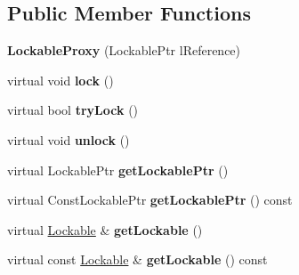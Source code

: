 \subsection*{Public Member Functions}
\begin{DoxyCompactItemize}
\item 
\hypertarget{classcore_1_1threading_1_1_lockable_proxy_a1b094fd270476942586424d0e05926b9}{{\bfseries Lockable\-Proxy} (Lockable\-Ptr l\-Reference)}\label{classcore_1_1threading_1_1_lockable_proxy_a1b094fd270476942586424d0e05926b9}

\item 
\hypertarget{classcore_1_1threading_1_1_lockable_proxy_a5e2568379e7f307d3dd5487d4eecf0ad}{virtual void {\bfseries lock} ()}\label{classcore_1_1threading_1_1_lockable_proxy_a5e2568379e7f307d3dd5487d4eecf0ad}

\item 
\hypertarget{classcore_1_1threading_1_1_lockable_proxy_a61b2ff8037fa96e8636eb7594214097b}{virtual bool {\bfseries try\-Lock} ()}\label{classcore_1_1threading_1_1_lockable_proxy_a61b2ff8037fa96e8636eb7594214097b}

\item 
\hypertarget{classcore_1_1threading_1_1_lockable_proxy_acb267ce5725011cd729eaf300ea0a82c}{virtual void {\bfseries unlock} ()}\label{classcore_1_1threading_1_1_lockable_proxy_acb267ce5725011cd729eaf300ea0a82c}

\item 
\hypertarget{classcore_1_1threading_1_1_lockable_proxy_a6c2725f84357c795694c026f30a593a0}{virtual Lockable\-Ptr {\bfseries get\-Lockable\-Ptr} ()}\label{classcore_1_1threading_1_1_lockable_proxy_a6c2725f84357c795694c026f30a593a0}

\item 
\hypertarget{classcore_1_1threading_1_1_lockable_proxy_a9e759252b36c8ac5e9ad97d1d95d26e8}{virtual Const\-Lockable\-Ptr {\bfseries get\-Lockable\-Ptr} () const }\label{classcore_1_1threading_1_1_lockable_proxy_a9e759252b36c8ac5e9ad97d1d95d26e8}

\item 
\hypertarget{classcore_1_1threading_1_1_lockable_proxy_a6f02484bc12697f14eb445061db78588}{virtual \hyperlink{classcore_1_1threading_1_1_lockable}{Lockable} \& {\bfseries get\-Lockable} ()}\label{classcore_1_1threading_1_1_lockable_proxy_a6f02484bc12697f14eb445061db78588}

\item 
\hypertarget{classcore_1_1threading_1_1_lockable_proxy_ae5d10745bb00e1bb653948c8c0047c2c}{virtual const \hyperlink{classcore_1_1threading_1_1_lockable}{Lockable} \& {\bfseries get\-Lockable} () const }\label{classcore_1_1threading_1_1_lockable_proxy_ae5d10745bb00e1bb653948c8c0047c2c}

\end{DoxyCompactItemize}
